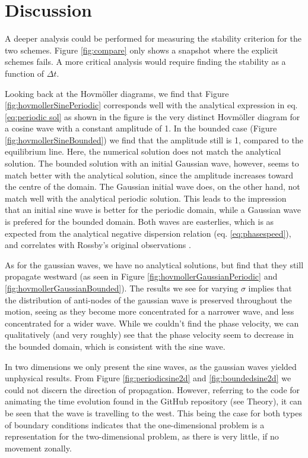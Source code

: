 \section{Discussion}
\label{sec:discussion}

A deeper analysis could be performed for measuring the stability criterion for the two schemes. Figure \ref{fig:compare} only shows a snapshot where the explicit schemes fails. A more critical analysis would require finding the stability as a function of $\Delta t$.

Looking back at the Hovmöller diagrams, we find that Figure \ref{fig:hovmollerSinePeriodic} corresponds well with the analytical expression in eq. \ref{eq:periodic sol} as shown in the figure is the very distinct Hovmöller diagram for a cosine wave with a constant amplitude of 1. In the bounded case (Figure \ref{fig:hovmollerSineBounded}) we find that the amplitude still is 1, compared to the equilibrium line. Here, the numerical solution does not match the analytical solution. The bounded solution with an initial Gaussian wave, however, seems to match better with the analytical solution, since the amplitude increases toward the centre of the domain. The Gaussian initial wave does, on the other hand, not match well with the analytical periodic solution. This leads to the impression that an initial sine wave is better for the periodic domain, while a Gaussian wave is prefered for the bounded domain. Both waves are easterlies, which is as expected from the analytical negative dispersion relation (eq. \ref{eq:phasespeed}), and correlates with Rossby's original observations \citep{rossby}.

As for the gaussian waves, we have no analytical solutions, but find that they still propagate westward (as seen in Figure \ref{fig:hovmollerGaussianPeriodic} and \ref{fig:hovmollerGaussianBounded}). The results we see for varying $\sigma$ implies that the distribution of anti-nodes of the gaussian wave is preserved throughout the motion, seeing as they become more concentrated for a narrower wave, and less concentrated for a wider wave. While we couldn't find the phase velocity, we can qualitatively (and very roughly) see that the phase velocity seem to decrease in the bounded domain, which is consistent with the sine wave.

In two dimensions we only present the sine waves, as the gaussian waves yielded unphysical results. From Figure \ref{fig:periodicsine2d} and \ref{fig:boundedsine2d} we could not discern the direction of propagation. However, referring to the code for animating the time evolution found in the GitHub repository (see Theory), it can be seen that the wave is travelling to the west. This being the case for both types of boundary conditions indicates that the one-dimensional problem is a representation for the two-dimensional problem, as there is very little, if no movement zonally.
